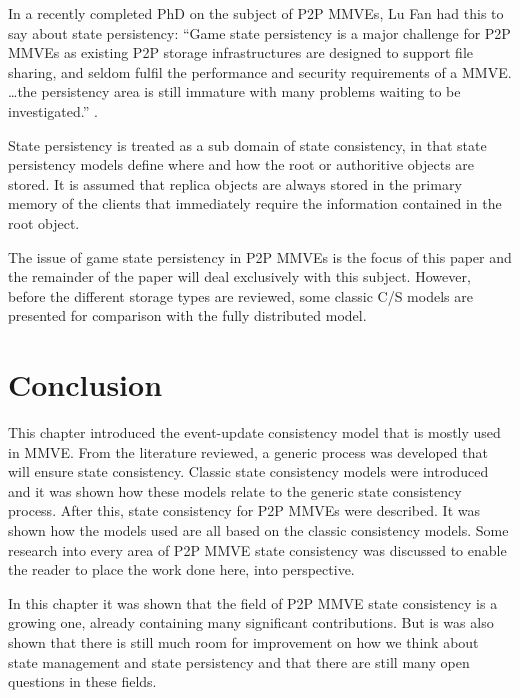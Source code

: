 In a recently completed PhD on the subject of P2P MMVEs, Lu Fan had this to say about state persistency: ``Game state persistency is a major challenge for P2P MMVEs as existing P2P storage infrastructures are designed to support file sharing, and seldom fulfil the performance and security requirements of a MMVE. \ldots the persistency area is still immature with many problems waiting to be investigated.'' \cite{Fan_phd}.

State persistency is treated as a sub domain of state consistency, in that state persistency models define where and how the root or authoritive
objects are stored. It is assumed that replica objects are always stored in the primary memory of the clients that immediately require the
information contained in the root object.

The issue of game state persistency in P2P MMVEs is the focus of this paper and the remainder of the paper will deal exclusively with this subject.
However, before the different storage types are reviewed, some classic C/S models are presented for comparison with the fully distributed model.

\section{Conclusion}

This chapter introduced the event-update consistency model that is mostly used in MMVE. From the literature reviewed, a generic process was developed that will ensure state consistency. Classic state consistency models were introduced and it was shown how these models relate to the generic state consistency process. After this, state consistency for P2P MMVEs were described. It was shown how the models used are all based on the classic consistency models. Some research into every area of P2P MMVE state consistency was discussed to enable the reader to place the work done here, into perspective.

In this chapter it was shown that the field of P2P MMVE state consistency is a growing one, already containing many significant contributions. But is was also shown that there is still much room for improvement on how we think about state management and state persistency and that there are still many open questions in these fields.